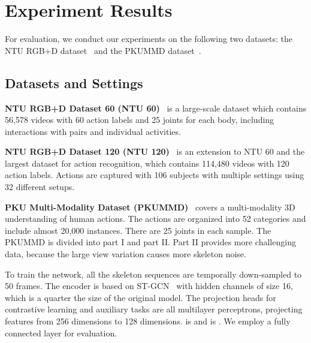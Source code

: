 \documentclass[twocolumn]{article}
\begin{document}
\section{Experiment Results}

For evaluation, we conduct our experiments on the following two datasets: the NTU RGB+D dataset~\cite{shahroudy2016ntu,liu2019ntu} and the PKUMMD dataset~\cite{liu2020pku}. 


\subsection{Datasets and Settings}
\noindent \textbf{NTU RGB+D Dataset 60 (NTU 60)}~\cite{shahroudy2016ntu} is a large-scale dataset which contains 56,578 videos with 60 action labels and 25 joints for each body, including interactions with pairs and individual activities.

\vspace{1mm}

\noindent \textbf{NTU RGB+D Dataset 120 (NTU 120)}~\cite{liu2019ntu} is an extension to NTU 60 and the largest dataset for action recognition, which contains 114,480 videos with 120 action labels. Actions are captured with 106 subjects with multiple settings using 32 different setups.


\vspace{1mm}

\noindent \textbf{PKU Multi-Modality Dataset (PKUMMD)}~\cite{liu2020pku} covers a multi-modality 3D understanding of human actions. The actions are organized into 52 categories and include almost 20,000 instances. There are 25 joints in each sample. The PKUMMD is divided into part I and part II. Part II provides more challenging data, because the large view variation causes more skeleton noise.

To train the network, all the skeleton sequences are temporally down-sampled to 50 frames. The encoder  is based on ST-GCN~\cite{yan2018spatial} with hidden channels of size 16, which is a quarter the size of the original model. The projection heads for contrastive learning and auxiliary tasks are all multilayer perceptrons, projecting features from 256 dimensions to 128 dimensions.  is  and  is . We employ a fully connected layer  for evaluation.
\end{document}
